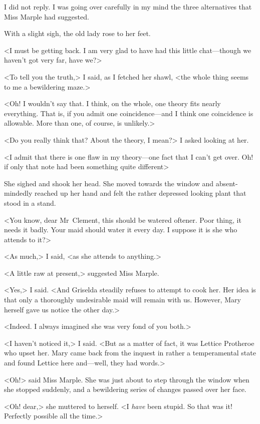 I did not reply. I was going over carefully in my mind the three alternatives that Miss Marple had suggested.

With a slight sigh, the old lady rose to her feet.

<I must be getting back. I am very glad to have had this little chat—though we haven't got very far, have we?>

<To tell you the truth,> I said, as I fetched her shawl, <the whole thing seems to me a bewildering maze.>

<Oh! I wouldn't say that. I think, on the whole, one theory fits nearly everything. That is, if you admit one coincidence—and I think one coincidence is allowable. More than one, of course, is unlikely.>

<Do you really think that? About the theory, I mean?> I asked looking at her.

<I admit that there is one flaw in my theory—one fact that I can't get over. Oh! if only that note had been something quite different\longdash>

She sighed and shook her head. She moved towards the window and absent-mindedly reached up her hand and felt the rather depressed looking plant that stood in a stand.

<You know, dear Mr~Clement, this should be watered oftener. Poor thing, it needs it badly. Your maid should water it every day. I suppose it is she who attends to it?>

<As much,> I said, <as she attends to anything.>

<A little raw at present,> suggested Miss Marple.

<Yes,> I said. <And Griselda steadily refuses to attempt to cook her. Her idea is that only a thoroughly undesirable maid will remain with us. However, Mary herself gave us notice the other day.>

<Indeed. I always imagined she was very fond of you both.>

<I haven't noticed it,> I said. <But as a matter of fact, it was Lettice Protheroe who upset her. Mary came back from the inquest in rather a temperamental state and found Lettice here and—well, they had words.>

<Oh!> said Miss Marple. She was just about to step through the window when she stopped suddenly, and a bewildering series of changes passed over her face.

<Oh! dear,> she muttered to herself. <I \emph{have} been stupid. So that was it! Perfectly possible all the time.>

